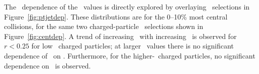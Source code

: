 The \ptjet\ dependence of the \RDptr\ values is directly explored by overlaying 
\ptjet\ selections in Figure~\ref{fig:ptjetdep}. These distributions are for the 0--10\% 
most central collisions, for the same two charged-particle \pt\ selections shown in Figure~\ref{fig:centdep}. 
  A trend of increasing \RDptr\ with increasing \ptjet\ is observed for $r < 0.25$ for low 
\pt\ charged particles; at larger \rvar\ values there is no significant dependence of \RDptr\ on \ptjet. 
Furthermore, for the higher-\pt\ charged particles, no significant dependence on \ptjet\ is observed. 


